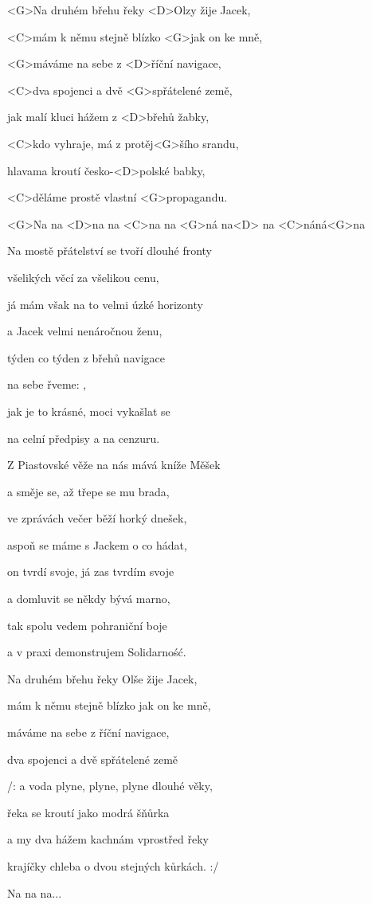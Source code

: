 
\zs
<G>Na druhém břehu řeky <D>Olzy žije Jacek, 

<C>mám k němu stejně blízko <G>jak on ke mně, 

<G>máváme na sebe z <D>říční navigace, 

<C>dva spojenci a dvě <G>spřátelené země, 

jak malí kluci hážem z <D>břehů žabky, 

<C>kdo vyhraje, má z protěj<G>šího srandu, 

hlavama kroutí česko-<D>polské babky, 

<C>děláme prostě vlastní <G>propagandu. 

<G>Na na <D>na na <C>na na <G>ná na<D> na <C>náná<G>na 
\ks

\zs
Na mostě přátelství se tvoří dlouhé fronty 

všelikých věcí za všelikou cenu, 

já mám však na to velmi úzké horizonty 

a Jacek velmi nenáročnou ženu, 

týden co týden z břehů navigace 

na sebe řveme: , 

jak je to krásné, moci vykašlat se 

na celní předpisy a na cenzuru.
\ks

\zs
Z Piastovské věže na nás mává kníže Měšek 

a směje se, až třepe se mu brada, 

ve zprávách večer běží horký dnešek, 

aspoň se máme s Jackem o co hádat, 

on tvrdí svoje, já zas tvrdím svoje 

a domluvit se někdy bývá marno, 

tak spolu vedem pohraniční boje 

a v praxi demonstrujem Solidarno\'s\'c.
\ks

\zs
Na druhém břehu řeky Olše žije Jacek, 

mám k němu stejně blízko jak on ke mně, 

máváme na sebe z říční navigace, 

dva spojenci a dvě spřátelené země 

/: a voda plyne, plyne, plyne dlouhé věky, 

řeka se kroutí jako modrá šňůrka 

a my dva hážem kachnám vprostřed řeky 

krajíčky chleba o dvou stejných kůrkách. :/ 

Na na na...
\ks
\kp
